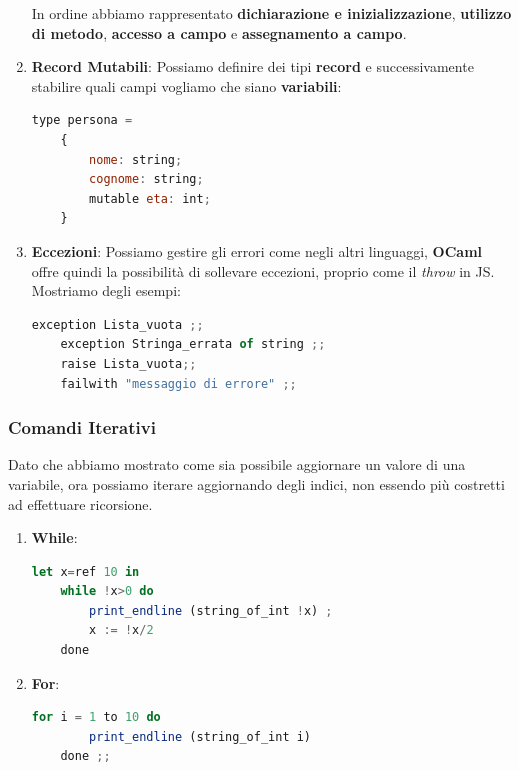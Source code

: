 \documentclass{article}
\begin{document}
\begin{enumerate}
In ordine abbiamo rappresentato \textbf{dichiarazione e inizializzazione}, \textbf{utilizzo di metodo}, \textbf{accesso a campo} e \textbf{assegnamento a campo}.

\newpage

\item \textbf{Record Mutabili}: Possiamo definire dei tipi \textbf{record} e successivamente stabilire quali campi vogliamo che siano \textbf{variabili}:

\begin{lstlisting}[language = JavaScript]
    type persona = 
    {
        nome: string;
        cognome: string;
        mutable eta: int;
    }
\end{lstlisting}
\vspace*{-20px}

\item \textbf{Eccezioni}: Possiamo gestire gli errori come negli altri linguaggi, \textbf{OCaml} offre quindi la possibilità di sollevare eccezioni, proprio come il \textit{throw} in JS. Mostriamo degli esempi:

\begin{lstlisting}[language = JavaScript]
    exception Lista_vuota ;;
    exception Stringa_errata of string ;;
    raise Lista_vuota;;
    failwith "messaggio di errore" ;;
\end{lstlisting}
\vspace*{-20px}
    
\end{enumerate}

\subsubsection{Comandi Iterativi}

Dato che abbiamo mostrato come sia possibile aggiornare un valore di una variabile, ora possiamo iterare aggiornando degli indici, non essendo più costretti ad effettuare ricorsione.

\begin{enumerate}
    \item \textbf{While}:
\begin{lstlisting}[language = JavaScript]
    let x=ref 10 in
    while !x>0 do
        print_endline (string_of_int !x) ;
        x := !x/2
    done
\end{lstlisting}
\vspace*{-20px}

    \item \textbf{For}:
\begin{lstlisting}[language = JavaScript]
    for i = 1 to 10 do
        print_endline (string_of_int i)
    done ;;
\end{lstlisting}
\vspace*{-20px}

\end{enumerate}
\end{document}
